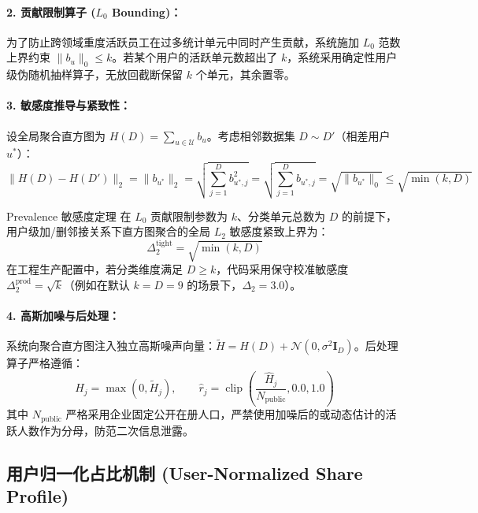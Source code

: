 \paragraph{2. 贡献限制算子 ($L_0$ Bounding)：}
为了防止跨领域重度活跃员工在过多统计单元中同时产生贡献，系统施加 $L_0$ 范数上界约束 $\|b_u\|_0 \le k$。若某个用户的活跃单元数超出了 $k$，系统采用确定性用户级伪随机抽样算子，无放回截断保留 $k$ 个单元，其余置零。

\paragraph{3. 敏感度推导与紧致性：}
设全局聚合直方图为 $H(D) = \sum_{u \in \mathcal{U}} b_u$。考虑相邻数据集 $D \sim D'$（相差用户 $u^*$）：
\begin{equation}
  \|H(D) - H(D')\|_2 = \|b_{u^*}\|_2 = \sqrt{\sum_{j=1}^D b_{u^*, j}^2} = \sqrt{\sum_{j=1}^D b_{u^*, j}} = \sqrt{\|b_{u^*}\|_0} \le \sqrt{\min(k, D)}
\end{equation}
\begin{techbox}{Prevalence 敏感度定理}
在 $L_0$ 贡献限制参数为 $k$、分类单元总数为 $D$ 的前提下，用户级加/删邻接关系下直方图聚合的全局 $L_2$ 敏感度紧致上界为：
\begin{equation}
  \Delta_2^{\text{tight}} = \sqrt{\min(k, D)}
\end{equation}
在工程生产配置中，若分类维度满足 $D \ge k$，代码采用保守校准敏感度 $\Delta_2^{\text{prod}} = \sqrt{k}$（例如在默认 $k=D=9$ 的场景下，$\Delta_2 = 3.0$）。
\end{techbox}

\paragraph{4. 高斯加噪与后处理：}
系统向聚合直方图注入独立高斯噪声向量：$\tilde{H} = H(D) + \mathcal{N}(0, \sigma^2 \mathbf{I}_D)$。后处理算子严格遵循：
\begin{equation}
  \hat{H}_j = \max(0, \tilde{H}_j), \qquad \hat{r}_j = \operatorname{clip}\left(\frac{\hat{H}_j}{N_{\text{public}}}, 0.0, 1.0\right)
\end{equation}
其中 $N_{\text{public}}$ 严格采用企业固定公开在册人口，严禁使用加噪后的或动态估计的活跃人数作为分母，防范二次信息泄露。

\subsection{用户归一化占比机制 (User-Normalized Share Profile)}
